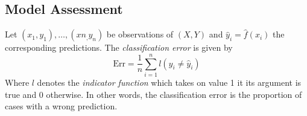 \documentclass[11pt]{article}
\theoremstyle{definition}
\begin{document}
\subsection{Model Assessment}
\begin{definition}
	Let $(x_1, y_1),\dots,(x n_,y_n)$ be observations of $(X,Y)$ and $\hat{y}_i = \hat{f}(x_i)$ the corresponding predictions. The \emph{classification error} is given by
	\begin{equation*}
		\text{Err} = \frac{1}{n}\sum_{i=1}^{n} l(y_i \neq \hat{y}_i)
	\end{equation*}
	Where $l$ denotes the \emph{indicator function} which takes on value 1 it its argument is true and 0 otherwise. In other words, the classification error is the proportion of cases with a wrong prediction.
\end{definition}
\end{document}
